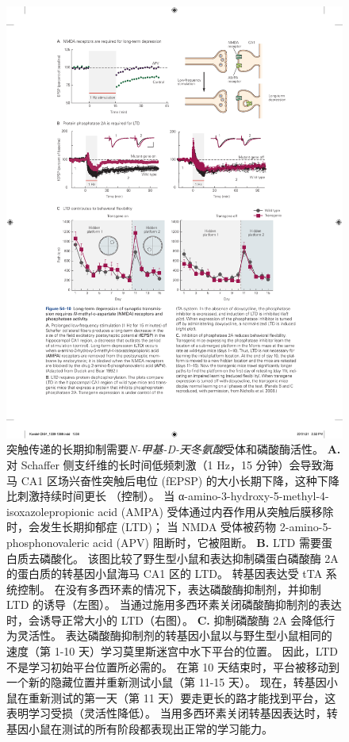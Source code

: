 \begin{figure}[htbp]
	\centering
	\includegraphics[width=0.95\linewidth]{chap54/fig_54_10}
	\caption{突触传递的长期抑制需要\textit{N-甲基-D-天冬氨酸}受体和磷酸酶活性。
		\textbf{A.} 对 Schaffer 侧支纤维的长时间低频刺激（1 Hz，15 分钟）会导致海马 CA1 区场兴奋性突触后电位 (fEPSP) 的大小长期下降，这种下降比刺激持续时间更长 （控制）。
		当 α-amino-3-hydroxy-5-methyl-4-isoxazolepropionic acid (AMPA) 受体通过内吞作用从突触后膜移除时，会发生长期抑郁症 (LTD)；
		当 NMDA 受体被药物 2-amino-5-phosphonovaleric acid (APV) 阻断时，它被阻断\cite{dudek1992homosynaptic}。
		\textbf{B.} LTD 需要蛋白质去磷酸化。
		该图比较了野生型小鼠和表达抑制磷蛋白磷酸酶 2A 的蛋白质的转基因小鼠海马 CA1 区的 LTD。
		转基因表达受 tTA 系统控制。
		在没有多西环素的情况下，表达磷酸酶抑制剂，并抑制 LTD 的诱导（左图）。
		当通过施用多西环素关闭磷酸酶抑制剂的表达时，会诱导正常大小的 LTD（右图）。
		\textbf{C.} 抑制磷酸酶 2A 会降低行为灵活性。
		表达磷酸酶抑制剂的转基因小鼠以与野生型小鼠相同的速度（第 1-10 天）学习莫里斯迷宫中水下平台的位置。
		因此，LTD 不是学习初始平台位置所必需的。
		在第 10 天结束时，平台被移动到一个新的隐藏位置并重新测试小鼠（第 11-15 天）。
		现在，转基因小鼠在重新测试的第一天（第 11 天）要走更长的路才能找到平台，这表明学习受损（灵活性降低）。
		当用多西环素关闭转基因表达时，转基因小鼠在测试的所有阶段都表现出正常的学习能力\cite{nicholls2008transgenic}。}
	\label{fig:54_10}
\end{figure}


